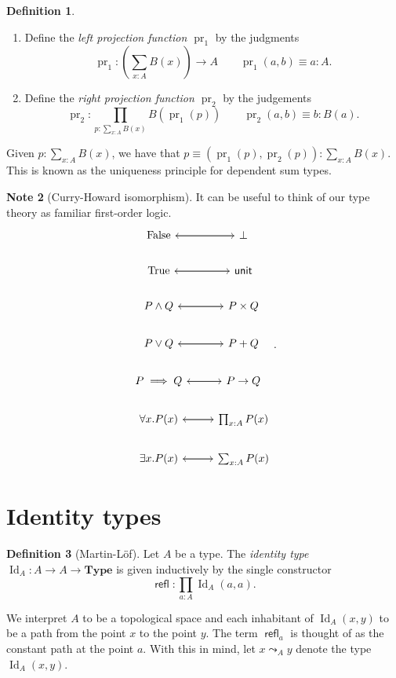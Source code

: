 \documentclass[10pt,letterpaper,cm]{nupset}
\theoremstyle{definition}
\newtheorem{definition}{Definition}[subsection]
\newtheorem{note}[definition]{Note}
\theoremstyle{theorem}
\theoremstyle{remark}
\newcommand{\1}{\mathbf{1}}
\newcommand{\0}{\vec 0}
\DeclareMathOperator{\id}{Id}
\DeclareMathOperator{\refl}{\mathsf{refl}}
\DeclareMathOperator{\pr}{pr}
\begin{document}
\begin{definition} $ $
\begin{enumerate}
\item Define the \textit{left projection function $\pr_1$} by the judgments $$\pr_1 : \left (\sum_{x:A}B(x) \right) \to A  \quad \quad \pr_1(a,b) \equiv a: A.$$
\item Define the \textit{right projection function $\pr_2$} by the judgements  $$ \pr_2 : \prod_{p: \sum_{x:A}B(x)} B(\pr_1(p)) \quad \quad \pr_2(a,b) \equiv b :B(a). $$
\end{enumerate}
\end{definition}


Given $p: \sum_{x:A} B(x)$, we have that $p\equiv \left(\pr_1(p), \pr_2(p)\right) : \sum_{x:A}B(x)$. This is known as the uniqueness principle for dependent sum types.

\pagebreak

\begin{note}[Curry-Howard isomorphism]
It can be useful to think of our type theory as familiar first-order logic.
\[
\begin{tikzcd}
\text{False} \arrow[r] & \bot \arrow[l] \\
\text{True} \arrow[r] & \mathsf{unit} \arrow[l] \\
P \land Q \arrow[r] & P\times Q \arrow[l] \\
P\vee Q \arrow[r] & P + Q \arrow[l] \\
P \implies Q \arrow[r] & P \to Q \arrow[l] \\
\forall x.P(x) \arrow[r] & \prod_{x:A}P(x) \arrow[l] \\
\exists x. P(x) \arrow[r] & \sum_{x:A}P(x) \arrow[l]
\end{tikzcd}
.\]
\end{note}

\section{Identity types}

\begin{definition}[Martin-L\"of]
Let $A$ be a type. The \textit{identity type $\id_A : A \to A \to \mathbf{Type}$} is given inductively  by the single constructor $$\refl : \prod_{a: A} \id_A(a,a).$$ 
\end{definition}

We interpret $A$ to be a topological space and each inhabitant of $\id_A(x,y)$ to be a path from the point $x$ to the point $y$. The term $\refl_a$ is thought of as the constant path at the point $a$. With this in mind, let $x \leadsto_A y$ denote the type $\id_A(x,y)$.
\end{document}
